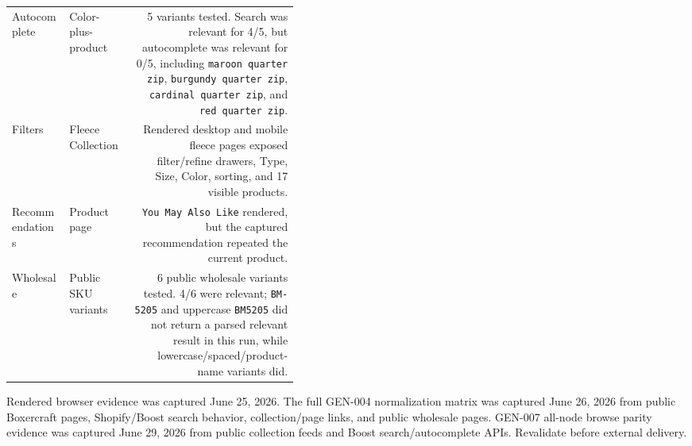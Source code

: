 \documentclass[10pt]{article}
\newcommand{\Code}[1]{\texttt{\fontsize{8.3}{9.4}\selectfont #1}}
\newcommand{\ReportFine}[1]{{\fontsize{7.45}{8.9}\selectfont\color{NVIMuted}#1}}
\begin{document}
\begin{tabularx}{\linewidth}{@{}L{0.20\linewidth}L{0.22\linewidth}N@{}}
Autocomplete & Color-plus-product & 5 variants tested. Search was relevant for 4/5, but autocomplete was relevant for 0/5, including \Code{maroon quarter zip}, \Code{burgundy quarter zip}, \Code{cardinal quarter zip}, and \Code{red quarter zip}.\\
Filters & Fleece Collection & Rendered desktop and mobile fleece pages exposed filter/refine drawers, Type, Size, Color, sorting, and 17 visible products.\\
Recommendations & Product page & \Code{You May Also Like} rendered, but the captured recommendation repeated the current product.\\
Wholesale & Public SKU variants & 6 public wholesale variants tested. 4/6 were relevant; \Code{BM-5205} and uppercase \Code{BM5205} did not return a parsed relevant result in this run, while lowercase/spaced/product-name variants did.\\
\bottomrule
\end{tabularx}
\vspace{0.12in}
\ReportFine{Rendered browser evidence was captured June 25, 2026. The full GEN-004 normalization matrix was captured June 26, 2026 from public Boxercraft pages, Shopify/Boost search behavior, collection/page links, and public wholesale pages. GEN-007 all-node browse parity evidence was captured June 29, 2026 from public collection feeds and Boost search/autocomplete APIs. Revalidate before external delivery.}
\end{document}
